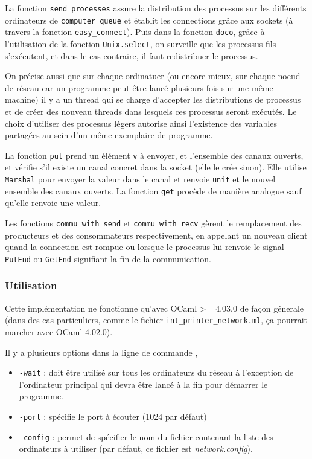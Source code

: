 La fonction \texttt{send\_processes} assure la distribution des
processus sur les différents ordinateurs de \texttt{computer\_queue} et
établit les connections grâce aux sockets (à travers la fonction
\texttt{easy\_connect}). Puis dans la fonction \texttt{doco}, grâce à
l'utilisation de la fonction \texttt{Unix.select}, on surveille que les
processus fils s'exécutent, et dans le cas contraire, il faut
redistribuer le processus.

On précise aussi que sur chaque ordinatuer (ou encore mieux, sur chaque
noeud de réseau car un programme peut être lancé plusieurs fois sur une
même machine) il y a un thread qui se charge d'accepter les
distributions de processus et de créer des nouveau threads dans lesquels
ces processus seront exécutés. Le choix d'utiliser des processus légers
autorise ainsi l'existence des variables partagées au sein d'un même
exemplaire de programme.

La fonction \texttt{put} prend un élément \texttt{v} à envoyer, et l'ensemble 
des canaux ouverts, et vérifie s'il existe un canal concret dans la socket
(elle le crée sinon). Elle utilise \texttt{Marshal} pour envoyer la
valeur dans le canal et renvoie \texttt{unit} et le nouvel ensemble des
canaux ouverts. La fonction \texttt{get} procède de manière analogue
sauf qu'elle renvoie une valeur.

Les fonctions \texttt{commu\_with\_send} et \texttt{commu\_with\_recv}
gèrent le remplacement des producteurs et des consommateurs
respectivement, en appelant un nouveau client quand la connection est
rompue ou lorsque le processus lui renvoie le signal \texttt{PutEnd} ou
\texttt{GetEnd} signifiant la fin de la communication.

\subsubsection{Utilisation}\label{utilisation}

Cette implémentation ne fonctionne qu'avec OCaml \textgreater{}= 4.03.0
de façon génerale (dans des cas particuliers, comme le fichier
\texttt{int\_printer\_network.ml}, ça pourrait marcher avec OCaml
4.02.0).

Il y a plusieurs options dans la ligne de commande ,

\begin{itemize}
\itemsep1pt\parskip0pt
\item
  \texttt{-wait} : doit être utilisé sur tous les ordinateurs du réseau
  à l'exception de l'ordinateur principal qui devra être lancé à la fin
  pour démarrer le programme.
\item
  \texttt{-port} : spécifie le port à écouter (1024 par défaut)
\item
  \texttt{-config} : permet de spécifier le nom du fichier contenant la
  liste des ordinateurs à utiliser (par défaut, ce fichier est
  \emph{network.config}).
\end{itemize}

